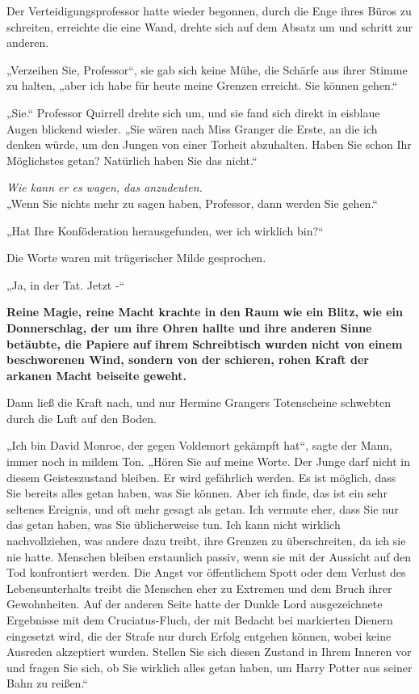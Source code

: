{Der Verteidigungsprofessor hatte wieder begonnen, durch die Enge ihres Büros zu schreiten, erreichte die eine Wand, drehte sich auf dem Absatz um und schritt zur anderen.

„Verzeihen Sie, Professor“, sie gab sich keine Mühe, die Schärfe aus ihrer Stimme zu halten, „aber ich habe für heute meine Grenzen erreicht. Sie können gehen.“

„Sie.“ Professor Quirrell drehte sich um, und sie fand sich direkt in eisblaue Augen blickend wieder. „Sie wären nach Miss Granger die Erste, an die ich denken würde, um den Jungen von einer Torheit abzuhalten. Haben Sie schon Ihr Möglichstes getan? Natürlich haben Sie das nicht.“

\emph{Wie kann er es wagen, das anzudeuten.}\\ „Wenn Sie nichts mehr zu sagen haben, Professor, dann werden Sie gehen.“

„Hat Ihre Konföderation herausgefunden, wer ich wirklich bin?“

Die Worte waren mit trügerischer Milde gesprochen.

„Ja, in der Tat. Jetzt -“

\textbf{Reine Magie, reine Macht krachte in den Raum wie ein Blitz, wie ein Donnerschlag, der um ihre Ohren hallte und ihre anderen Sinne betäubte, die Papiere auf ihrem Schreibtisch wurden nicht von einem beschworenen Wind, sondern von der schieren, rohen Kraft der arkanen Macht beiseite geweht.}

Dann ließ die Kraft nach, und nur Hermine Grangers Totenscheine schwebten durch die Luft auf den Boden.

„Ich bin David Monroe, der gegen Voldemort gekämpft hat“, sagte der Mann, immer noch in mildem Ton. „Hören Sie auf meine Worte. Der Junge darf nicht in diesem Geisteszustand bleiben. Er wird gefährlich werden. Es ist möglich, dass Sie bereits alles getan haben, was Sie können. Aber ich finde, das ist ein sehr seltenes Ereignis, und oft mehr gesagt als getan. Ich vermute eher, dass Sie nur das getan haben, was Sie üblicherweise tun. Ich kann nicht wirklich nachvollziehen, was andere dazu treibt, ihre Grenzen zu überschreiten, da ich sie nie hatte. Menschen bleiben erstaunlich passiv, wenn sie mit der Aussicht auf den Tod konfrontiert werden. Die Angst vor öffentlichem Spott oder dem Verlust des Lebensunterhalts treibt die Menschen eher zu Extremen und dem Bruch ihrer Gewohnheiten. Auf der anderen Seite hatte der Dunkle Lord ausgezeichnete Ergebnisse mit dem Cruciatus-Fluch, der mit Bedacht bei markierten Dienern eingesetzt wird, die der Strafe nur durch Erfolg entgehen können, wobei keine Ausreden akzeptiert wurden. Stellen Sie sich diesen Zustand in Ihrem Inneren vor und fragen Sie sich, ob Sie wirklich alles getan haben, um Harry Potter aus seiner Bahn zu reißen.“

}
